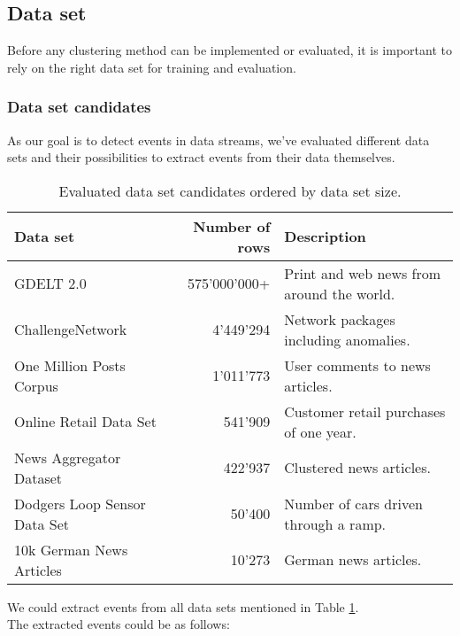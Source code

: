 \subsection{Data set}

Before any clustering method can be implemented or evaluated,
it is important to rely on the right data set for training and evaluation.

\subsubsection{Data set candidates}
As our goal is to detect events in data streams, we've evaluated different data sets and
their possibilities to extract events from their data themselves.

\begin{table}[h]
    \centering
    \begin{tabular}{|l|r|l|}
    \hline
    \textbf{Data set} & \textbf{Number of rows} & \textbf{Description} \\ \hline
    GDELT 2.0 & 575'000'000+ & Print and web news from around the world. \\ \hline
    ChallengeNetwork & 4'449'294 & Network packages including anomalies. \\ \hline
    One Million Posts Corpus & 1'011'773 & User comments to news articles. \\ \hline
    Online Retail Data Set & 541'909 & Customer retail purchases of one year. \\ \hline
    News Aggregator Dataset & 422'937 & Clustered news articles. \\ \hline
    Dodgers Loop Sensor Data Set & 50'400 & Number of cars driven through a ramp. \\ \hline
    10k German News Articles & 10'273 & German news articles. \\ \hline
    \end{tabular}
    \caption{Evaluated data set candidates ordered by data set size.}
    \label{tab:data_set_candidates}
\end{table}

We could extract events from all data sets mentioned in Table \ref{tab:data_set_candidates}.\\
The extracted events could be as follows:

